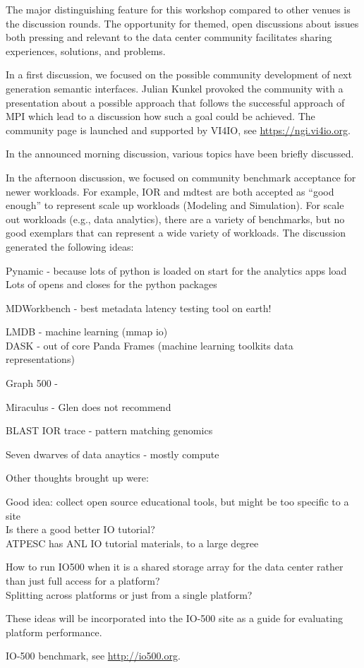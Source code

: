 \documentclass{llncs}
\begin{document}
The major distinguishing feature for this workshop compared to other venues is the discussion rounds.
The opportunity for themed, open discussions about issues both pressing and relevant to the data center
community facilitates sharing experiences, solutions, and problems.

In a first discussion, we focused on the possible community development of next generation semantic interfaces. Julian Kunkel provoked the community with a presentation about a possible approach that follows the successful approach of MPI which lead to a discussion how such a goal could be achieved.
The community page is launched and supported by VI4IO, see \url{https://ngi.vi4io.org}.


In the announced morning discussion, various topics have been briefly discussed.


In the afternoon discussion, we focused on community benchmark acceptance for newer workloads. For example, IOR and mdtest are both accepted as ``good enough'' to represent scale up workloads (Modeling and Simulation). For scale out workloads (e.g., data analytics), there are a variety of benchmarks, but no good exemplars that can represent a wide variety of workloads. The discussion generated the following ideas:

Pynamic - because lots of python is loaded on start for the analytics apps load\\
Lots of opens and closes for the python packages

MDWorkbench - best metadata latency testing tool on earth!

LMDB - machine learning (mmap io)\\
DASK - out of core Panda Frames (machine learning toolkits data representations)

Graph 500 - 

Miraculus - Glen does not recommend

BLAST IOR trace - pattern matching genomics

Seven dwarves of data anaytics - mostly compute

Other thoughts brought up were:

Good idea: collect open source educational tools, but might be too specific to a site\\
Is there a good better IO tutorial?\\
ATPESC has ANL IO tutorial materials, to a large degree

How to run IO500 when it is a shared storage array for the data center rather than just full access for a platform?\\
Splitting across platforms or just from a single platform?

These ideas will be incorporated into the IO-500 site as a guide for evaluating platform performance.

IO-500 benchmark, see \url{http://io500.org}.


{}
\end{document}
